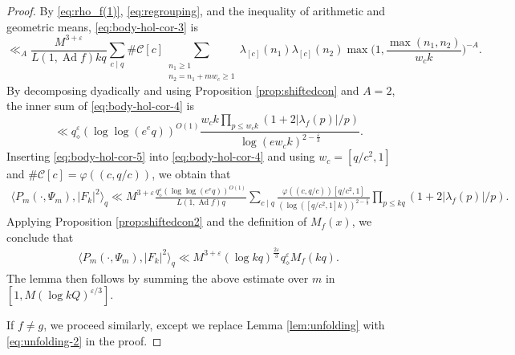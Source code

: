 \documentclass[12pt,reqno]{amsart}
\theoremstyle{remark}
\DeclareMathOperator{\ad}{Ad}
\numberwithin{equation}{section}
\begin{document}
\begin{proof}
        By \eqref{eq:rho_f(1)}, \eqref{eq:regrouping}, and the inequality of arithmetic and geometric means, \eqref{eq:body-hol-cor-3} is 
        \begin{equation}\label{eq:body-hol-cor-4}
			\ll_{A} \frac{M^{3+\varepsilon}}{L(1,\ad f)kq} \sum_{c\mid q}\#\mathcal{C}[c]  \sum_{\substack{n_1 \ge 1\\ n_2 = n_1+mw_c \ge 1}}\lambda_{[c]}(n_1)\lambda_{[c]}(n_2) \max\Big(1, \frac{\max(n_1,n_2)}{w_ck}\Big)^{-A}.
		\end{equation}
         By decomposing dyadically and using Proposition \ref{prop:shiftedcon} and $A =2$, the inner sum of \eqref{eq:body-hol-cor-4} is
		\begin{equation}
            \label{eq:body-hol-cor-5}
		\ll q_\diamond^\varepsilon (\log\log(e^eq))^{O(1)} \frac{w_ck\prod_{p\le w_ck}(1+2|\lambda_f(p)|/p)}{\log(ew_ck)^{2-\frac{\varepsilon}{3}}}. 
		\end{equation}
        Inserting \eqref{eq:body-hol-cor-5} into \eqref{eq:body-hol-cor-4} and using $w_c = [q/c^2, 1]$ and $\#\mathcal{C}[c] = \varphi((c,q/c))$, we obtain that
		\begin{equation*}
			\begin{aligned}
				\langle P_m(\cdot, \Psi_m), |F_k|^2 \rangle_q 
			\ll M^{3+\varepsilon}\frac{q_\diamond^\varepsilon (\log\log(e^eq))^{O(1)}}{L(1,\ad f)q}\sum_{c\mid q} \frac{\varphi((c,q/c))[q/c^2, 1]}{(\log([q/c^2, 1]k))^{2-\frac{\varepsilon}{3}}}\prod_{p\le kq}(1+2|\lambda_f(p)|/p).
			\end{aligned}
		\end{equation*}
	Applying Proposition \ref{prop:shiftedcon2} and the definition of $M_f(x)$, we conclude that 
    \begin{equation*}
        \begin{aligned}
        \langle P_m(\cdot, \Psi_m), |F_k|^2 \rangle_q
        \ll M^{3+\varepsilon}(\log kq )^{\frac{2\varepsilon}{3}}q_\diamond^\varepsilon M_f(kq).
        \end{aligned}
    \end{equation*}
    The lemma then follows by summing the above estimate over $m$ in $[1, M(\log kQ)^{\varepsilon/3}]$. 
    
   If $f \neq g$, we proceed similarly,  except we replace Lemma \ref{lem:unfolding} with \eqref{eq:unfolding-2} in the proof. 
   \end{proof}
    
\end{document}
